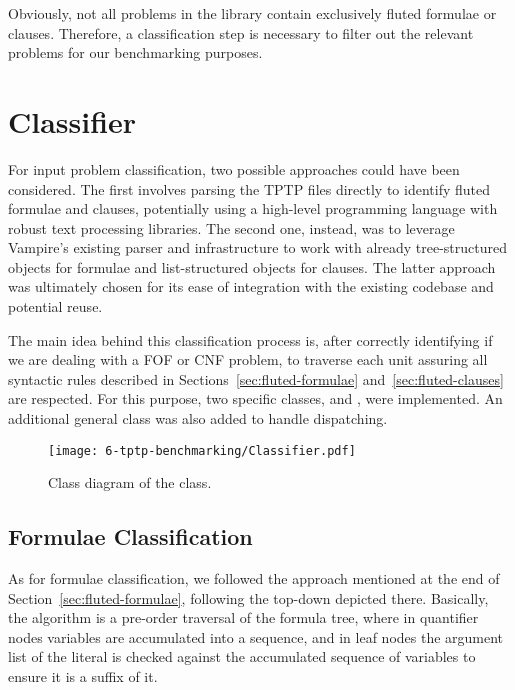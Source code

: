 Obviously, not all problems in the library contain exclusively fluted formulae or clauses. Therefore, a classification step is necessary to filter out the relevant problems for our benchmarking purposes.

\section{Classifier}\label{sec:classifier}

For input problem classification, two possible approaches could have been considered.
The first involves parsing the TPTP files directly to identify fluted formulae and clauses, potentially using a high-level programming language with robust text processing libraries.
The second one, instead, was to leverage Vampire's existing parser and infrastructure to work with already tree-structured objects for formulae and list-structured objects for clauses.
The latter approach was ultimately chosen for its ease of integration with the existing codebase and potential reuse.

The main idea behind this classification process is, after correctly identifying if we are dealing with a FOF or CNF problem, to traverse each unit assuring all syntactic rules described in Sections~\ref{sec:fluted-formulae} and~\ref{sec:fluted-clauses} are respected.
For this purpose, two specific classes,  and , were implemented. An additional general  class was also added to handle dispatching.

\begin{figure}[H]
  \centering
  \texttt{[image: 6-tptp-benchmarking/Classifier.pdf]}
  \caption{Class diagram of the  class.}\label{fig:classifier-uml}
\end{figure}
\subsection{Formulae Classification}\label{subsec:formulae-classification}
As for formulae classification, we followed the approach mentioned at the end of Section~\ref{sec:fluted-formulae}, following the top-down depicted there.
Basically, the algorithm is a pre-order traversal of the formula tree, where in quantifier nodes variables are accumulated into a sequence, and in leaf nodes the argument list of the literal is checked against the accumulated sequence of variables to ensure it is a suffix of it.

